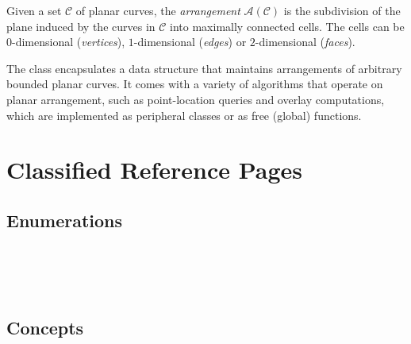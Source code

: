 
Given a set $\mathcal{C}$ of planar curves, the {\em arrangement}
${\mathcal A}({\mathcal C})$ is the subdivision of the plane induced
by the curves in $\mathcal{C}$ into maximally connected cells. The cells
can be $0$-dimensional ({\em vertices}), $1$-dimensional ({\em edges})
or $2$-dimensional ({\em faces}).

The class  encapsulates a data structure
that maintains arrangements of arbitrary bounded planar curves. It comes
with a variety of algorithms that operate on planar arrangement,
such as point-location queries and overlay computations, which are
implemented as peripheral classes or as free (global) functions.

\section{Classified Reference Pages}

\subsection*{Enumerations}

\\
\\
\\

\subsection*{Concepts}


